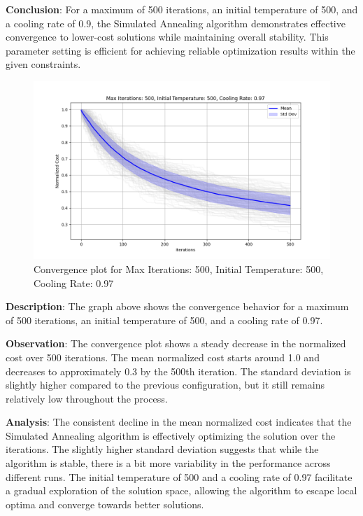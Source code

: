 \documentclass[
]{article}
\begin{document}
    \textbf{Conclusion}: For a maximum of 500 iterations, an initial temperature of 500, and a cooling rate of 0.9, the Simulated Annealing algorithm demonstrates effective convergence to lower-cost solutions while maintaining overall stability. This parameter setting is efficient for achieving reliable optimization results within the given constraints.

    \begin{figure}[H]
        \centering
        \includegraphics[width=\textwidth]{simulated_annealing/max_iter_500_init_temp_500_cooling_rate_0.97}
        \caption{Convergence plot for Max Iterations: 500, Initial Temperature: 500, Cooling Rate: 0.97}
        \label{fig:sa_500_500_0.97}
    \end{figure}

    \textbf{Description}: The graph above shows the convergence behavior for a maximum of 500 iterations, an initial temperature of 500, and a cooling rate of 0.97.

    \textbf{Observation}: The convergence plot shows a steady decrease in the normalized cost over 500 iterations. The mean normalized cost starts around 1.0 and decreases to approximately 0.3 by the 500th iteration. The standard deviation is slightly higher compared to the previous configuration, but it still remains relatively low throughout the process.

    \textbf{Analysis}: The consistent decline in the mean normalized cost indicates that the Simulated Annealing algorithm is effectively optimizing the solution over the iterations. The slightly higher standard deviation suggests that while the algorithm is stable, there is a bit more variability in the performance across different runs. The initial temperature of 500 and a cooling rate of 0.97 facilitate a gradual exploration of the solution space, allowing the algorithm to escape local optima and converge towards better solutions.
\end{document}
